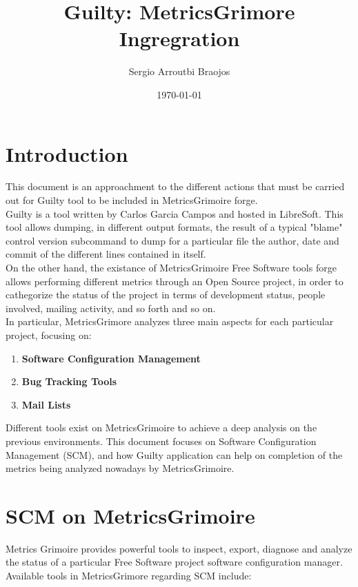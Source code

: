 \documentclass[11pt]{article}
\title{\textbf{Guilty: MetricsGrimore Ingregration}}
\author{Sergio Arroutbi Braojos}
\date{\today}
\begin{document}
\maketitle

\section{Introduction}

This document is an approachment to the different actions that must be carried out for Guilty tool to be included in MetricsGrimoire forge.\\

Guilty is a tool written by Carlos Garcia Campos and hosted in LibreSoft. This tool allows dumping, in different output formats, the result of a typical "blame" control version subcommand to dump for a particular file the author, date and commit of the different lines contained in itself.\\

On the other hand, the existance of MetricsGrimoire Free Software tools forge allows performing different metrics through an Open Source project, in order to cathegorize the status of the project in terms of development status, people involved, mailing activity, and so forth and so on.\\

In particular, MetricsGrimore analyzes three main aspects for each particular project, focusing on:
\begin{enumerate}
\item{\textbf{Software Configuration Management}}
\item{\textbf{Bug Tracking Tools}}
\item{\textbf{Mail Lists}}
\end{enumerate}

Different tools exist on MetricsGrimoire to achieve a deep analysis on the previous environments. This document focuses on Software Configuration Management (SCM), and how Guilty application can help on completion of the metrics being analyzed nowadays by MetricsGrimoire.

\section{SCM on MetricsGrimoire}
Metrics Grimoire provides powerful tools to inspect, export, diagnose and analyze the status of a particular Free Software project software configuration manager. Available tools in MetricsGrimore regarding SCM include:
\end{document}
